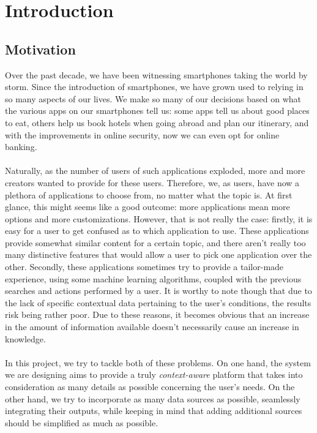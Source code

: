 \chapter{Introduction}
\label{Introduction}
\thispagestyle{empty}
\section{Motivation}
Over the past decade, we have been witnessing smartphones taking the world by storm. Since the introduction of smartphones, we have grown used to relying in so many aspects of our lives. We make so many of our decisions based on what the various apps on our smartphones tell us: some apps tell us about good places to eat, others help us book hotels when going abroad and plan our itinerary, and with the improvements in online security, now we can even opt for online banking.\\\\
Naturally, as the number of users of such applications exploded, more and more creators wanted to provide for these users. Therefore, we, as users, have now a plethora of applications to choose from, no matter what the topic is. At first glance, this might seems like a good outcome: more applications mean more options and more customizations. However, that is not really the case: firstly, it is easy for a user to get confused as to which application to use. These applications provide somewhat similar content for a certain topic, and there aren't really too many distinctive features that would allow a user to pick one application over the other. Secondly, these applications sometimes try to provide a tailor-made experience, using some machine learning algorithms, coupled with the previous searches and actions performed by a user. It is worthy to note though that due to the lack of specific contextual data pertaining to the user's conditions, the results risk being rather poor. Due to these reasons, it becomes obvious that an increase in the amount of information available doesn't necessarily cause an increase in knowledge.\\\\
In this project, we try to tackle both of these problems. On one hand, the system we are designing aims to provide a truly \emph{context-aware} platform that takes into consideration as many details as possible concerning the user's needs. On the other hand, we try to incorporate as many data sources as possible, seamlessly integrating their outputs, while keeping in mind that adding additional sources should be simplified as much as possible.\\\\
